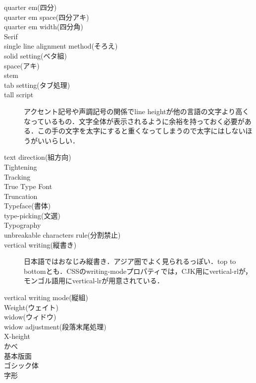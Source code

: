 \begin{description}
    \item[quarter em(四分)]
    \item[quarter em space(四分アキ)]
    \item[quarter em width(四分角)]
    \item[Serif]
    \item[single line alignment method(そろえ)]
    \item[solid setting(ベタ組)]
    \item[space(アキ)]
    \item[stem]
    \item[tab setting(タブ処理)]
    \item[tall script]アクセント記号や声調記号の関係でline heightが他の言語の文字より高くなっているもの．文字全体が表示されるように余裕を持っておく必要がある\cite{developer.apple.com:videos/play/wwdc2016/201/}．この手の文字を太字にすると重くなってしまうので太字にはしないほうがいいらしい\cite{material.io:design/typography/language-support.html}．
    \item[text direction(組方向)]
    \item[Tightening]
    \item[Tracking]
    \item[True Type Font]
    \item[Truncation]
    \item[Typeface(書体)]
    \item[type-picking(文選)]
    \item[Typography]
    \item[unbreakable characters rule(分割禁止)]
    \item[vertical writing(縦書き)] 日本語ではおなじみ縦書き．アジア圏でよく見られるっぽい．top to bottomとも\cite{eikaiwa.dmm.com:uknow/questions/29852/}\cite{www.w3.org:International/questions/qa-scripts}．CSSの{\sf writing-mode}プロパティでは，CJK用に{\sf vertical-rl}が，モンゴル語用に{\sf vertical-lr}が用意されている\cite{www.w3.org:International/articles/vertical-text/}．
    \item[vertical writing mode(縦組)]
    \item[Weight(ウェイト)]
    \item[widow(ウィドウ)]
    \item[widow adjustment(段落末尾処理)]
    \item[X-height]
    \item[かべ]
    \item[基本版面]
    \item[ゴシック体]
    \item[字形]

\end{description}
